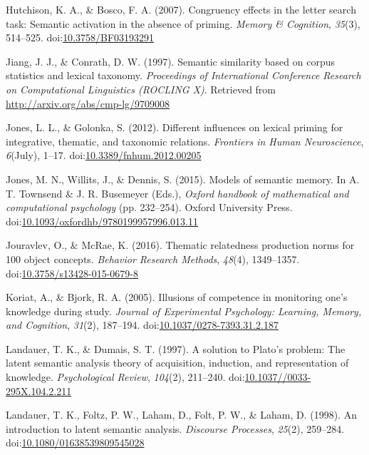 \documentclass[english,man]{apa6}
\theoremstyle{definition}
\theoremstyle{definition}
\theoremstyle{definition}
\theoremstyle{remark}
\begin{document}
\hypertarget{ref-Hutchison2007}{}
Hutchison, K. A., \& Bosco, F. A. (2007). Congruency effects in the
letter search task: Semantic activation in the absence of priming.
\emph{Memory \& Cognition}, \emph{35}(3), 514--525.
doi:\href{https://doi.org/10.3758/BF03193291}{10.3758/BF03193291}

\hypertarget{ref-Jiang1997}{}
Jiang, J. J., \& Conrath, D. W. (1997). Semantic similarity based on
corpus statistics and lexical taxonomy. \emph{Proceedings of
International Conference Research on Computational Linguistics (ROCLING
X)}. Retrieved from \url{http://arxiv.org/abs/cmp-lg/9709008}

\hypertarget{ref-Jones2012}{}
Jones, L. L., \& Golonka, S. (2012). Different influences on lexical
priming for integrative, thematic, and taxonomic relations.
\emph{Frontiers in Human Neuroscience}, \emph{6}(July), 1--17.
doi:\href{https://doi.org/10.3389/fnhum.2012.00205}{10.3389/fnhum.2012.00205}

\hypertarget{ref-Jones2015}{}
Jones, M. N., Willits, J., \& Dennis, S. (2015). Models of semantic
memory. In A. T. Townsend \& J. R. Busemeyer (Eds.), \emph{Oxford
handbook of mathematical and computational psychology} (pp. 232--254).
Oxford University Press.
doi:\href{https://doi.org/10.1093/oxfordhb/9780199957996.013.11}{10.1093/oxfordhb/9780199957996.013.11}

\hypertarget{ref-Jouravlev2016}{}
Jouravlev, O., \& McRae, K. (2016). Thematic relatedness production
norms for 100 object concepts. \emph{Behavior Research Methods},
\emph{48}(4), 1349--1357.
doi:\href{https://doi.org/10.3758/s13428-015-0679-8}{10.3758/s13428-015-0679-8}

\hypertarget{ref-Koriat2005}{}
Koriat, A., \& Bjork, R. A. (2005). Illusions of competence in
monitoring one's knowledge during study. \emph{Journal of Experimental
Psychology: Learning, Memory, and Cognition}, \emph{31}(2), 187--194.
doi:\href{https://doi.org/10.1037/0278-7393.31.2.187}{10.1037/0278-7393.31.2.187}

\hypertarget{ref-Landauer1997}{}
Landauer, T. K., \& Dumais, S. T. (1997). A solution to Plato's problem:
The latent semantic analysis theory of acquisition, induction, and
representation of knowledge. \emph{Psychological Review}, \emph{104}(2),
211--240.
doi:\href{https://doi.org/10.1037//0033-295X.104.2.211}{10.1037//0033-295X.104.2.211}

\hypertarget{ref-Landauer1998}{}
Landauer, T. K., Foltz, P. W., Laham, D., Folt, P. W., \& Laham, D.
(1998). An introduction to latent semantic analysis. \emph{Discourse
Processes}, \emph{25}(2), 259--284.
doi:\href{https://doi.org/10.1080/01638539809545028}{10.1080/01638539809545028}
\end{document}
